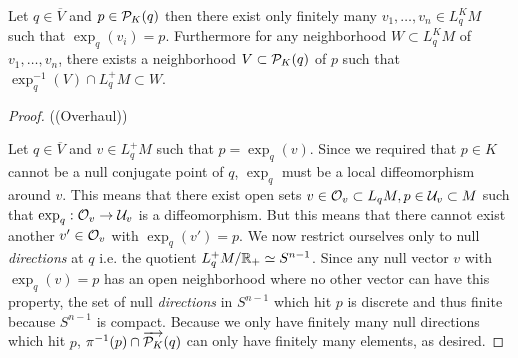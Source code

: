 \begin{lemma}\label{lem:finitevecs}
    Let $q\in \overline{V}$ and $p\in \mathcal{P}_K(q)$ then there exist only finitely many $v_1,\dots,v_n\in L^K_qM$ such that $\exp_q(v_i)=p$. Furthermore for any neighborhood $W\subset L^K_qM$ of $v_1,\dots,v_n$, there exists a neighborhood $V\subset \mathcal{P}_K(q)$ of $p$ such that $\exp^{-1}_q(V) \cap L^+_qM \subset W$. 
\end{lemma}
\begin{proof}
    ((Overhaul))

    Let $q\in \overline{V}$ and $v\in L^+_qM$ such that $p=\exp_q(v)$. Since we required that $p\in K$ cannot be a null conjugate point of $q$, $\exp_q$ must be a local diffeomorphism around $v$. This means that there exist open sets $v\in\mathcal{O}_v\subset L_qM, p\in \mathcal{U}_v\subset M$ such that $\exp_q:\mathcal{O}_v\to \mathcal{U}_v$ is a diffeomorphism. But this means that there cannot exist another $v'\in \mathcal{O}_v$ with $\exp_q(v')=p$. We now restrict ourselves only to null \emph{directions} at $q$ i.e. the quotient $L^+_qM/\mathbb{R}_+ \simeq S^{n-1}$. Since any null vector $v$ with $\exp_q(v)=p$ has an open neighborhood where no other vector can have this property, the set of null \emph{directions} in $S^{n-1}$ which hit $p$ is discrete and thus finite because $S^{n-1}$ is compact. Because we only have finitely many null directions which hit $p$, $\pi^{-1}(p)\cap \overrightarrow{\mathcal{P}_K}(q)$ can only have finitely many elements, as desired.
\end{proof}


